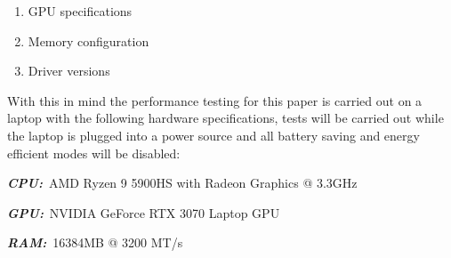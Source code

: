\begin{enumerate}
    \item GPU specifications
    \item Memory configuration
    \item Driver versions
\end{enumerate}

With this in mind the performance testing for this paper is carried out on a laptop with the following hardware
specifications, tests will be carried out while the laptop is plugged into a power source and all battery saving and
energy efficient modes will be disabled:

\begin{description}
    \item \textbf{\textit{CPU:}}~AMD Ryzen 9 5900HS with Radeon Graphics @ 3.3GHz
    \item \textbf{\textit{GPU:}}~NVIDIA GeForce RTX 3070 Laptop GPU
    \item \textbf{\textit{RAM:}}~16384MB @ 3200 MT/s
\end{description}
